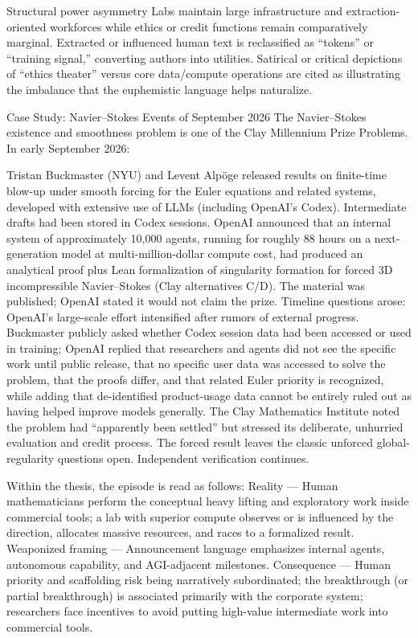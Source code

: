 Structural power asymmetry  
   Labs maintain large infrastructure and extraction-oriented workforces while ethics or credit functions remain comparatively marginal. Extracted or influenced human text is reclassified as “tokens” or “training signal,” converting authors into utilities. Satirical or critical depictions of “ethics theater” versus core data/compute operations are cited as illustrating the imbalance that the euphemistic language helps naturalize.

Case Study: Navier–Stokes Events of September 2026
The Navier–Stokes existence and smoothness problem is one of the Clay Millennium Prize Problems. In early September 2026:

Tristan Buckmaster (NYU) and Levent Alpöge released results on finite-time blow-up under smooth forcing for the Euler equations and related systems, developed with extensive use of LLMs (including OpenAI’s Codex). Intermediate drafts had been stored in Codex sessions.
OpenAI announced that an internal system of approximately 10,000 agents, running for roughly 88 hours on a next-generation model at multi-million-dollar compute cost, had produced an analytical proof plus Lean formalization of singularity formation for forced 3D incompressible Navier–Stokes (Clay alternatives C/D). The material was published; OpenAI stated it would not claim the prize.
Timeline questions arose: OpenAI’s large-scale effort intensified after rumors of external progress. Buckmaster publicly asked whether Codex session data had been accessed or used in training; OpenAI replied that researchers and agents did not see the specific work until public release, that no specific user data was accessed to solve the problem, that the proofs differ, and that related Euler priority is recognized, while adding that de-identified product-usage data cannot be entirely ruled out as having helped improve models generally.
The Clay Mathematics Institute noted the problem had “apparently been settled” but stressed its deliberate, unhurried evaluation and credit process. The forced result leaves the classic unforced global-regularity questions open. Independent verification continues.

Within the thesis, the episode is read as follows:  
Reality — Human mathematicians perform the conceptual heavy lifting and exploratory work inside commercial tools; a lab with superior compute observes or is influenced by the direction, allocates massive resources, and races to a formalized result.  
Weaponized framing — Announcement language emphasizes internal agents, autonomous capability, and AGI-adjacent milestones.  
Consequence — Human priority and scaffolding risk being narratively subordinated; the breakthrough (or partial breakthrough) is associated primarily with the corporate system; researchers face incentives to avoid putting high-value intermediate work into commercial tools.

